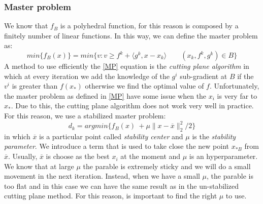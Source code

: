 \subsubsection{Master problem}
We know that $f_B$ is a polyhedral function, for this reason is composed by a finitely number of linear functions.
In this way, we can define the master problem as:
\begin{equation}
\label{MP}
min\{f_B(x)\} = min\{v : v \geq f^k + \langle g^k, x-x_k \rangle \qquad (x_k, f^k, g^k) \in B \}
\end{equation} 
A method to use efficiently the \ref{MP} equation is the \textit{cutting plane algorithm} in which at every iteration we add the knowledge of the $g^i$ sub-gradient at $B$ if the $v^i$ is greater than $f(x_*)$ otherwise we find the optimal value of $f$.  
Unfortunately, the master problem as defined in \ref{MP} have some issue when the $x_i$ is very far to $x_*$. Due to this, the cutting plane algorithm does not work very well in practice.
For this reason, we use a stabilized master problem: 
\begin{equation}
\label{SMP}
 d_{k}=argmin\{f_B(x)\ + \mu \parallel x- \overline{x}\parallel_{2}^2/2 \}
\end{equation} 
in which $\overline{x}$ is a particular point called \textit{stability center} and $\mu$ is the \textit{stability parameter}. We introduce a term that is used to take close the new point $x_{*B}$ from $\overline{x}$.
Usually, $\overline{x}$ is choose as the best $x_i$ at the moment and $\mu$ is an hyperparameter.
We know that at large $\mu$ the parable is extremely sticky and we will do a small movement in the next iteration.
Instead, when we have a small $\mu$, the parable is too flat and in this case we can have the same result as in the un-stabilized cutting plane method. For this reason, is important to find the right $\mu$ to use.
